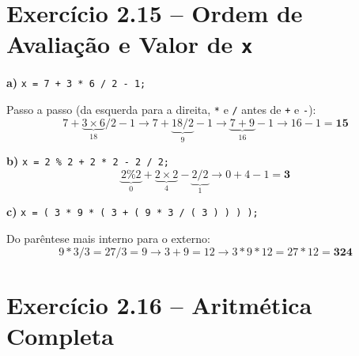\documentclass[12pt,a4paper]{article}
\begin{document}
\section{Exercício 2.15 -- Ordem de Avaliação e Valor de \texttt{x}}

\begin{respostabox}[title={Exercício 2.15}]

\textbf{a)} \texttt{x = 7 + 3 * 6 / 2 - 1;}

Passo a passo (da esquerda para a direita, \texttt{*} e \texttt{/} antes de \texttt{+} e \texttt{-}):
\[
7 + \underbrace{3 \times 6}_{18} / 2 - 1 \to 7 + \underbrace{18 / 2}_{9} - 1 \to \underbrace{7 + 9}_{16} - 1 \to 16 - 1 = \mathbf{15}
\]

\textbf{b)} \texttt{x = 2 \% 2 + 2 * 2 - 2 / 2;}
\[
\underbrace{2 \% 2}_{0} + \underbrace{2 \times 2}_{4} - \underbrace{2 / 2}_{1} \to 0 + 4 - 1 = \mathbf{3}
\]

\textbf{c)} \texttt{x = ( 3 * 9 * ( 3 + ( 9 * 3 / ( 3 ) ) ) );}

Do parêntese mais interno para o externo:
\[
9 * 3 / 3 = 27/3 = 9 \to 3 + 9 = 12 \to 3 * 9 * 12 = 27 * 12 = \mathbf{324}
\]
\end{respostabox}

\section{Exercício 2.16 -- Aritmética Completa}
\end{document}
